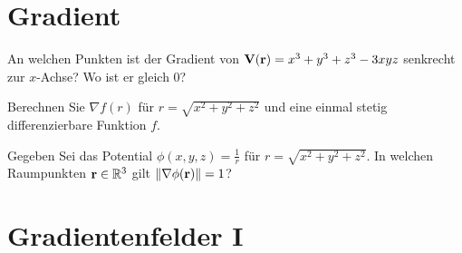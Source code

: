 \documentclass{scrartcl}
\begin{document}
\maketitle

\section{Gradient }
\label{sec:gradient}

\begin{subex}
  \item{} An welchen Punkten ist der Gradient von $\mathbf{V}(\mathbf{r}) = x^3 + y^3 + z^3 - 3xyz$ senkrecht zur $x$-Achse?
  Wo ist er gleich 0?
  \item{} Berechnen Sie $\nabla f(r)$ für $r = \sqrt{x^2 + y^2 + z^2}$ und eine einmal stetig differenzierbare Funktion $f$.
  \item{} Gegeben Sei das Potential $\phi(x, y, z) = \frac{1}{r}$ für $r = \sqrt{x^2 + y^2 + z^2}$. In welchen Raumpunkten $\mathbf{r} \in \mathbb{R}^3$ gilt $\Vert \nabla \phi (\mathbf{r}) \Vert = 1$?
\end{subex}

\section{Gradientenfelder I }
\label{sec:gradientenfelder1}
\end{document}
